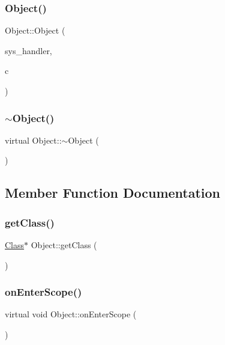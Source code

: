 \subsubsection{\texorpdfstring{Object()}{Object()}}
{\footnotesize\ttfamily Object\+::\+Object (\begin{DoxyParamCaption}\item[{\hyperlink{classSystemHandler}{System\+Handler} $\ast$}]{sys\+\_\+handler,  }\item[{\hyperlink{classClass}{Class} $\ast$}]{c }\end{DoxyParamCaption})}

\mbox{\label{classObject_aa3e791419d84c4c346ef9499513b8e00}} 
\subsubsection{\texorpdfstring{$\sim$\+Object()}{~Object()}}
{\footnotesize\ttfamily virtual Object\+::$\sim$\+Object (\begin{DoxyParamCaption}{ }\end{DoxyParamCaption})\hspace{0.3cm}{\ttfamily [virtual]}}



\subsection{Member Function Documentation}
\mbox{\label{classObject_a51f229ad629a4ac1ad6e359a3b53941d}} 
\subsubsection{\texorpdfstring{get\+Class()}{getClass()}}
{\footnotesize\ttfamily \hyperlink{classClass}{Class}$\ast$ Object\+::get\+Class (\begin{DoxyParamCaption}{ }\end{DoxyParamCaption})}

\mbox{\label{classObject_a61b4cd86dd434abf07e3f4d19b5c93eb}} 
\subsubsection{\texorpdfstring{on\+Enter\+Scope()}{onEnterScope()}}
{\footnotesize\ttfamily virtual void Object\+::on\+Enter\+Scope (\begin{DoxyParamCaption}{ }\end{DoxyParamCaption})\hspace{0.3cm}{\ttfamily [virtual]}}



